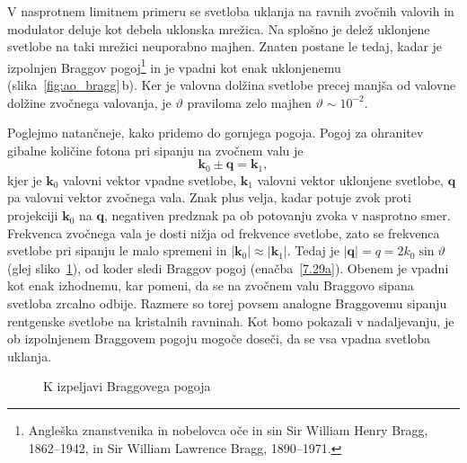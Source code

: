 V nasprotnem limitnem primeru se svetloba uklanja na ravnih zvočnih valovih in modulator deluje 
kot debela uklonska mrežica. 
Na splošno je delež uklonjene svetlobe na taki mrežici neuporabno majhen. 
Znaten postane le tedaj, kadar je izpolnjen Braggov
pogoj\footnote{Angleška znanstvenika in nobelovca oče in sin Sir William Henry Bragg, 1862--1942,
in Sir William Lawrence Bragg, 1890--1971.}
in je vpadni kot enak uklonjenemu (slika~\ref{fig:ao_bragg}\,b).
Ker je valovna dolžina svetlobe precej manjša od valovne dolžine zvočnega valovanja, je $\vartheta$
praviloma zelo majhen $\vartheta \sim 10^{-2}$. 

Poglejmo natančneje, kako pridemo do gornjega pogoja. Pogoj
za ohranitev gibalne količine fotona pri sipanju na zvočnem valu je
\begin{equation}
\mathbf{k}_{0}\pm\mathbf{q}=\mathbf{k}_{1},
\label{7.30}
\end{equation}
kjer je $\mathbf{k}_{0}$ valovni vektor vpadne svetlobe, $\mathbf{k}_{1}$
valovni vektor uklonjene svetlobe, $\mathbf{q}$ pa valovni
vektor zvočnega vala. Znak plus velja, kadar potuje zvok proti projekciji
$\mathbf{k}_{0}$ na $\mathbf{q}$, negativen predznak pa ob potovanju zvoka v nasprotno smer. 
Frekvenca zvočnega vala je dosti nižja od frekvence svetlobe, zato se frekvenca svetlobe 
pri sipanju le malo spremeni in $|\mathbf{k}_{0}| \approx |\mathbf{k}_{1}|$.
Tedaj je $|\mathbf{q}| = q=2k_{0}\sin\vartheta$ 
(glej sliko~\ref{fig:ao_bragg3}), od koder sledi Braggov pogoj 
(enačba~\ref{7.29a}). Obenem je vpadni kot enak izhodnemu, kar pomeni, da se na
zvočnem valu Braggovo sipana svetloba zrcalno odbije. Razmere so torej
povsem analogne Braggovemu sipanju rentgenske svetlobe na kristalnih
ravninah. Kot bomo pokazali v nadaljevanju, je ob izpolnjenem Braggovem pogoju mogoče doseči, 
da se vsa vpadna svetloba uklanja.
\begin{figure}[h]
\centering
\def\svgwidth{40truemm} 

\caption{K izpeljavi Braggovega pogoja}
\label{fig:ao_bragg3}
\end{figure}
